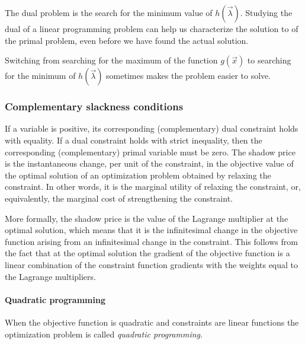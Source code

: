 \documentclass[11pt,oneside]{article}
\begin{document}
			
			The dual problem is the search for the minimum value of $h(\vec{\lambda})$.
			Studying the dual of a linear programming problem can help us characterize the solution to of the primal problem,
			even before we have found the actual solution.

			Switching from searching for the maximum of the function $g(\vec{x})$ to searching for the minimum of $h(\vec{\lambda})$
			sometimes makes the problem easier to solve.


		\subsubsection{Complementary slackness conditions}		

			If a variable is positive, its corresponding (complementary) dual constraint holds with equality.
			If a dual constraint holds with strict inequality, then the corresponding (complementary) primal variable must be zero.
			The shadow price is the instantaneous change, per unit of the constraint, in the objective value of the optimal solution
			of an optimization problem obtained by relaxing the constraint.
			In other words, it is the marginal utility of relaxing the constraint,
			or, equivalently, the marginal cost of strengthening the constraint.

			More formally, the shadow price is the value of the Lagrange multiplier at the optimal solution,
			which means that it is the infinitesimal change in the objective function arising from an infinitesimal change in the constraint.
			This follows from the fact that at the optimal solution the gradient of the objective function
			is a linear combination of the constraint function gradients with the weights equal to the Lagrange multipliers.



	\paragraph{Quadratic programming}
	
		When the objective function is quadratic and constraints are linear functions
		the optimization problem is called \emph{quadratic programming}.
\end{document}
